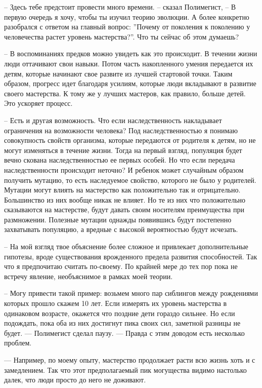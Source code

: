\documentclass[12pt,a4paper]{article}
\begin{document}
-- Здесь тебе предстоит провести много времени. -- сказал Полимегист, -- В первую очередь я хочу, чтобы ты изучил теорию эволюции. А более конкретно разобрался с ответом на главный вопрос: ''Почему от поколения к поколению у человечества растет уровень мастерства?''. Что ты сейчас об этом думаешь?

-- В воспоминаниях предков можно увидеть как это происходит. В течении жизни люди оттачивают свои навыки. Потом часть накопленного умения передается их детям, которые начинают свое развите из лучшей стартовой точки. Таким образом, прогресс идет благодаря усилиям, которые люди вкладывают в развитие своего мастерства. К тому же у лучших мастеров, как правило, больше детей. Это ускоряет процесс.

-- Есть и другая возможность. Что если наследственность накладывает ограничения на возможности человека? Под наследственностью я понимаю совокупность свойств организма, которые передаются от родителя к детям, но не могут изменяться в течение жизни. Тогда на первый взгляд, популяция будет вечно скована наследственностью ее первых особей. Но что если передача наследственности происходит неточно? И ребенок может случайным образом получить мутацию, то есть наследуемое свойство, которого не было у родителей. Мутации могут влиять на мастерство как положительно так и отрицательно. Большинство из них вообще никак не влияет. Но те из них что положительно сказываются на мастерстве, будут давать своим носителям преимущества при размножении. Полезные мутации однажды появившись будут постепенно захватывать популяцию, а вредные с высокой вероятностью будут исчезать.

-- На мой взгляд твое объяснение более сложное и привлекает дополнительные гипотезы, вроде существования врожденного предела развития способностей. Так что я предпочитаю считать по-своему. По крайней мере до тех пор пока не встречу явление, необъяснимое в рамках моей теории.

-- Могу привести такой пример: возьмем много пар сиблингов между рождениями которых прошло скажем 10 лет. Если измерять их уровень мастерства в одинаковом возрасте, окажется что поздние дети гораздо сильнее. Но если подождать, пока оба из них достигнут пика своих сил, заметной разницы не будет. --- Полимегист сделал паузу. --- Правда с этим доводом есть несколько проблем.

--- Например, по моему опыту, мастерство продолжает расти всю жизнь хоть и с замедлением. Так что этот предполагаемый пик могущества видимо настолько далек, что люди просто до него не доживают.
\end{document}
